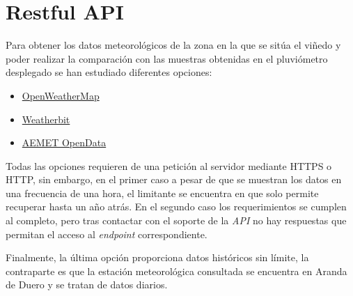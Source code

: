 \section{Restful API}
Para obtener los datos meteorológicos de la zona en la que se sitúa el viñedo y poder
realizar la comparación con las muestras obtenidas en el pluviómetro desplegado se han 
estudiado diferentes opciones:
\begin{itemize}
    \item \href{https://openweathermap.org/}{OpenWeatherMap}
    \item \href{https://www.weatherbit.io/}{Weatherbit}
    \item \href{https://www.aemet.es/es/datos_abiertos/AEMET_OpenData}{AEMET OpenData}
\end{itemize}

Todas las opciones requieren de una petición al servidor mediante HTTPS o HTTP, sin 
embargo, en el primer caso a pesar de que se muestran los datos en una frecuencia 
de una hora, el limitante se encuentra en que solo permite recuperar hasta un año atrás.
En el segundo caso los requerimientos se cumplen al completo, pero tras contactar con el
soporte de la \textit{API} no hay respuestas que permitan el acceso al 
\textit{endpoint} correspondiente.

Finalmente, la última opción proporciona datos históricos sin límite, la contraparte es
que la estación meteorológica consultada se encuentra en Aranda de Duero y se tratan de
datos diarios.
